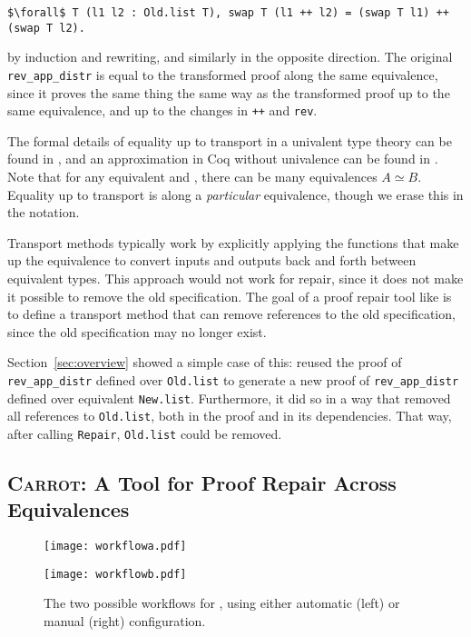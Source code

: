 \begin{lstlisting}
$\forall$ T (l1 l2 : Old.list T), swap T (l1 ++ l2) = (swap T l1) ++ (swap T l2).
\end{lstlisting}
by induction and rewriting, and similarly in the opposite direction.
The original \lstinline{rev_app_distr} is equal to the transformed proof along the same equivalence,
since it proves the same thing the same way as the transformed proof up to the same equivalence, and up to the changes in \lstinline{++}
and \lstinline{rev}.

The formal details of equality up to transport in a univalent type theory can be found in \citet{univalent2013homotopy}, and an approximation in Coq without univalence can be found in \citet{tabareau2017equivalences}.
Note that for any equivalent \A and \B, there can be many equivalences $A \simeq B$.
Equality up to transport is along a \textit{particular} equivalence, though we erase this in the notation.

Transport methods typically work by explicitly applying the functions that make up the equivalence to convert
inputs and outputs back and forth between equivalent types.
This approach would not work for repair, since it does not make it possible to remove the old specification.
The goal of a proof repair tool like \toolname is to define a transport method that
can remove references to the old specification, %
since the old specification may no longer exist.

Section~\ref{sec:overview} showed a simple case of this: \toolname
reused the proof of \lstinline{rev_app_distr} defined over \lstinline{Old.list}
to generate a new proof of \lstinline{rev_app_distr} defined over equivalent \lstinline{New.list}.
Furthermore, it did so in a way that removed all references to \lstinline{Old.list}, both in the proof
and in its dependencies.
That way, after calling \lstinline{Repair}, \lstinline{Old.list} could be removed.

\subsection{\textsc{Carrot}: A Tool for Proof Repair Across Equivalences}
\label{sec:time}

\begin{figure*}
\begin{minipage}{0.52\textwidth}
\texttt{[image: workflowa.pdf]}
\end{minipage}
\hfill
\begin{minipage}{0.45\textwidth}
\texttt{[image: workflowb.pdf]}
\vspace{0.97cm}
\end{minipage}
\vspace{-0.4cm}
\caption{The two possible workflows for \toolname, using either automatic (left) or manual (right) configuration.}
\label{fig:system}
\end{figure*}

